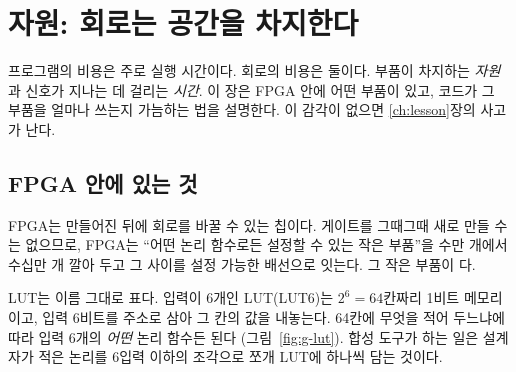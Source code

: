 \chapter{자원: 회로는 공간을 차지한다}\label{ch:resources}

프로그램의 비용은 주로 실행 시간이다. 회로의 비용은 둘이다. 부품이 차지하는 \emph{자원}과 신호가 지나는
데 걸리는 \emph{시간}. 이 장은 FPGA 안에 어떤 부품이 있고, 코드가 그 부품을 얼마나 쓰는지 가늠하는 법을
설명한다. 이 감각이 없으면 \ref{ch:lesson}장의 사고가 난다.

\section{FPGA 안에 있는 것}

\Why FPGA는 만들어진 뒤에 회로를 바꿀 수 있는 칩이다. 게이트를 그때그때 새로 만들 수는 없으므로,
FPGA는 ``어떤 논리 함수로든 설정할 수 있는 작은 부품''을 수만 개에서 수십만 개 깔아 두고 그 사이를
설정 가능한 배선으로 잇는다. 그 작은 부품이 다.

LUT는 이름 그대로 표다. 입력이 6개인 LUT(LUT6)는 $2^6 = 64$칸짜리 1비트 메모리이고, 입력 6비트를 주소로
삼아 그 칸의 값을 내놓는다. 64칸에 무엇을 적어 두느냐에 따라 입력 6개의 \emph{어떤} 논리 함수든 된다
(그림~\ref{fig:g-lut}). 합성 도구가 하는 일은 설계자가 적은 논리를 6입력 이하의 조각으로 쪼개 LUT에
하나씩 담는 것이다.

